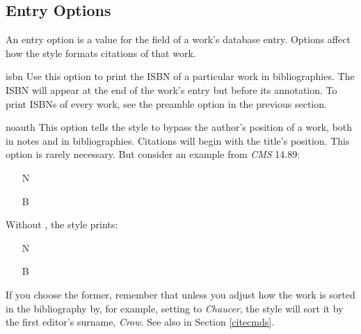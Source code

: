 \documentclass[11pt,letterpaper,oneside]{article}
\begin{document}
\subsection{Entry Options}
\label{entryops}

An entry option is a value for the  field of a
work's database entry. Options affect how the style formats citations
of that work.

\begin{marglist}

\item[isbn] Use this option to print the ISBN of a particular work in
bibliographies. The ISBN will appear at the end of the work's entry
but before its annotation. To print ISBNs of every work, see the
 preamble option in the previous section.

\item[noauth] This option tells the style to bypass the author's
position of a work, both in notes and in bibliographies. Citations
will begin with the title's position. This option is rarely necessary.
But consider an example from \textit{CMS} 14.89:

\begin{itemize}
\item[N] 

\item[B] 
\end{itemize}

\noindent Without , the style prints:


\begin{itemize}
\item[N] 

\item[B] 
\end{itemize}

\noindent If you choose the former, remember that unless you adjust
how the work is sorted in the bibliography by, for example, setting
 to \textit{Chaucer}, the style will sort it by the
first editor's surname, \textit{Crow}. See also  in Section
\ref{citecmds}.


\end{marglist}
\end{document}
